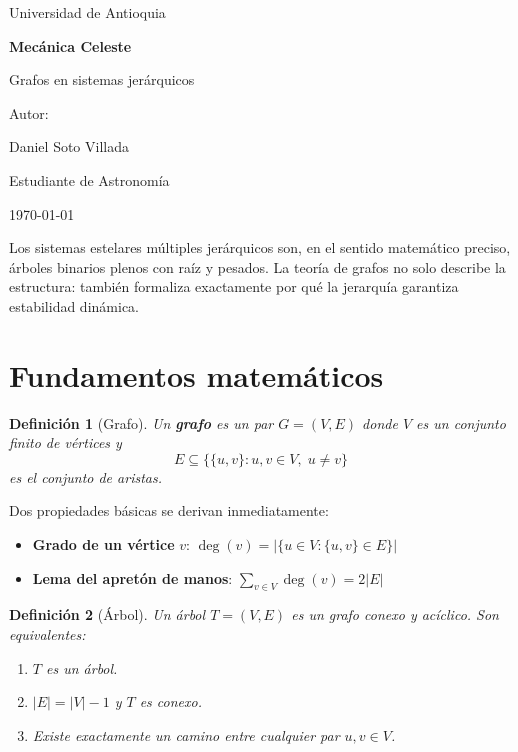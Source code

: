 \documentclass[a4paper]{article}
\newtheorem{definicion}{Definición}
\begin{document}
\begin{titlepage}
  \centering
  {\Large Universidad de Antioquia\par}
  \vspace{2cm}
  {\huge\bfseries Mecánica Celeste\par}
  \vspace{0.4cm}
  {\Large Grafos en sistemas jerárquicos \par}
  \vspace{2.5cm}
  {\large Autor:\par}
  \vspace{0.2cm}
  {\large Daniel Soto Villada\par}
  {\large Estudiante de Astronomía\par}
  \vfill
  {\large \today\par}
\end{titlepage}

\newpage
\tableofcontents
\newpage


Los sistemas estelares múltiples jerárquicos son, en el sentido
matemático preciso, árboles binarios plenos con raíz y pesados.
La teoría de grafos no solo describe la estructura: también formaliza
exactamente por qué la jerarquía garantiza estabilidad dinámica.

\section{Fundamentos matemáticos}

\begin{definicion}[Grafo]
Un \textbf{grafo} es un par $G = (V, E)$ donde $V$ es un conjunto finito
de vértices y
$$E \subseteq \bigl\{\{u,v\} : u,v \in V,\; u \neq v\bigr\}$$
es el conjunto de aristas.
\end{definicion}

Dos propiedades básicas se derivan inmediatamente:

\begin{itemize}
  \item \textbf{Grado de un vértice} $v$:
        $\deg(v) = \bigl|\{u \in V : \{u,v\} \in E\}\bigr|$
  \item \textbf{Lema del apretón de manos}:
        $\displaystyle\sum_{v \in V} \deg(v) = 2|E|$
\end{itemize}

\begin{definicion}[Árbol]
Un árbol $T = (V, E)$ es un grafo conexo y acíclico. Son equivalentes:
\begin{enumerate}
  \item $T$ es un árbol.
  \item $|E| = |V| - 1$ y $T$ es conexo.
  \item Existe exactamente un camino entre cualquier par $u, v \in V$.
\end{enumerate}
\end{definicion}
\end{document}
